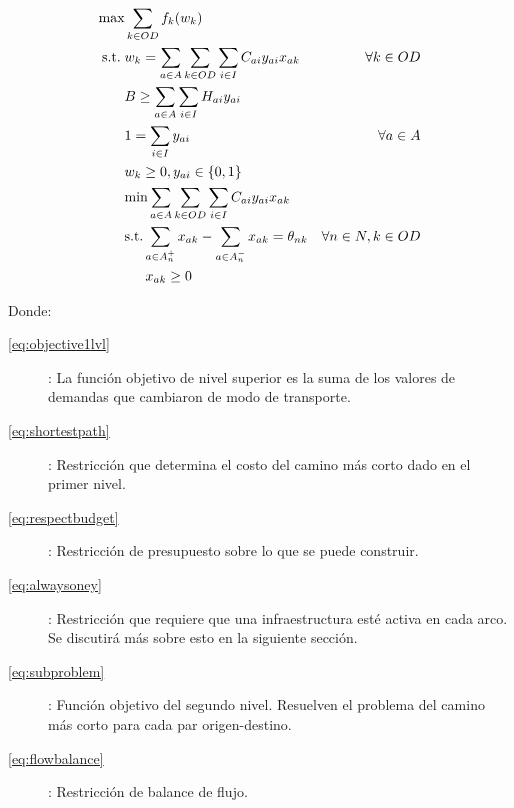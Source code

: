 \documentclass{article}
\newcommand{\modelspace}{\hspace{1.5em}}
\begin{document}
  \begin{align}
    \text{max}    & \sum_{k \in OD} f_k(w_k)                                                         & \label{eq:objective1lvl} \\
    \text{s.t.}\; & w_k = \sum_{a \in A} \sum_{k \in OD} \sum_{i \in I} C_{ai}y_{ai}x_{ak}           & \forall k \in OD \label{eq:shortestpath} \\
                  & B \geq \sum_{a \in A} \sum_{i \in I} H_{ai}y_{ai}                                & \label{eq:respectbudget} \\
                  & 1 = \sum_{i \in I} y_{ai}                                                        & \forall a \in A \label{eq:alwaysoney} \\
                  & w_k \geq 0, y_{ai} \in \{0,1\}                                                   & \nonumber \\
                  & \text{min} \sum_{a \in A} \sum_{k \in OD} \sum_{i \in I} C_{ai}y_{ai}x_{ak}      & \label{eq:subproblem} \\
                  & \text{s.t.} \sum_{a \in A_n^+} x_{ak} - \sum_{a \in A_n^-} x_{ak} = \theta_{nk}  & \forall n \in N, k \in OD \label {eq:flowbalance} \\
                  & \modelspace x_{ak} \geq 0                                                        & \nonumber
  \end{align}

  Donde:

  \begin{description}
    \item[\ref{eq:objective1lvl}]: La función objetivo de nivel superior es la suma de los valores de demandas que cambiaron de modo de transporte.
    \item[\ref{eq:shortestpath}]: Restricción que determina el costo del camino más corto dado en el primer nivel.
    \item[\ref{eq:respectbudget}]: Restricción de presupuesto sobre lo que se puede construir.
    \item[\ref{eq:alwaysoney}]: Restricción que requiere que una infraestructura esté activa en cada arco. Se discutirá más sobre esto en la siguiente sección.
    \item[\ref{eq:subproblem}]: Función objetivo del segundo nivel. Resuelven el problema del camino más corto para cada par origen-destino.
    \item[\ref{eq:flowbalance}]: Restricción de balance de flujo.
  \end{description}
\end{document}
